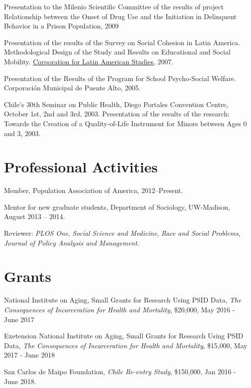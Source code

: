 \documentclass[10pt,letterpaper]{article}
\renewenvironment{itemize}{
  \begin{list}{}{
    \setlength{\leftmargin}{1.5em}
    \setlength{\itemsep}{0.25em}
    \setlength{\parskip}{0pt}
    \setlength{\parsep}{0.25em}
  }
}{
  \end{list}
}
\begin{document}
\begin{itemize}
\item	Presentation to the Milenio Scientific Committee of the results of project Relationship between the Onset of Drug Use and the Initiation in Delinquent Behavior in a Prison Population, 2009

\item Presentation of the results of the Survey on Social Cohesion in Latin America. Methodological Design of the Study and Results on Educational and Social Mobility. \href{http://www.cieplan.org/}{Corporation for Latin American Studies}, 2007.

\item Presentation of the Results of the Program for School Psycho-Social Welfare. Corporación Municipal de Puente Alto, 2005.

\item Chile’s 30th Seminar on Public Health, Diego Portales Convention Centre, October 1st, 2nd and 3rd, 2003. Presentation of the results of the research: Towards the Creation of a Quality-of-Life Instrument for Minors between Ages 0 and 3, 2003.

\end{itemize}

\section*{Professional Activities}

\begin{itemize}
\item Member, Population Association of America, 2012--Present.
\item Mentor for new graduate students, Department of Sociology, UW-Madison,
August 2013 – 2014.
\item Reviewer: \textit{PLOS One}, \textit{Social Science and Medicine}, \textit{Race and Social Problems}, \textit{Journal of Policy Analysis and Management}.
\end{itemize}

\section*{Grants}

\begin{itemize}
\item National Institute on Aging, Small Grants for Research Using PSID Data, \textit{The Consequences of Incarceration for Health and Mortality},  \$20,000, May 2016 - June 2017
\item Exetension National Institute on Aging, Small Grants for Research Using PSID Data, \textit{The Consequences of Incarceration for Health and Mortality},  \$15,000, May 2017 - June 2018
\item San Carlos de Maipo Foundation, \textit{Chile Re-entry Study}, \$150,000, Jan 2016 - June 2018.
\end{itemize}
\end{document}
